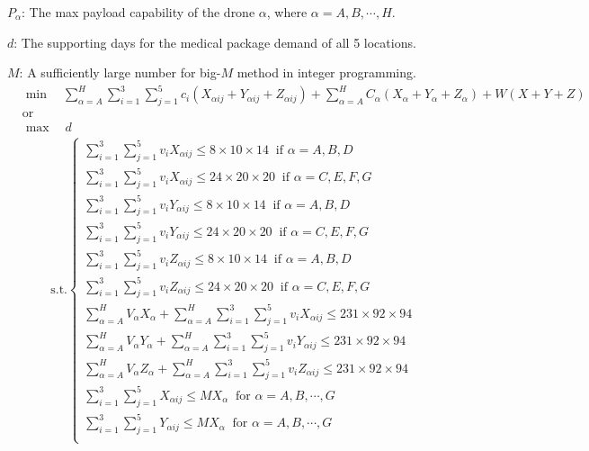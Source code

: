 \documentclass{mcmthesis}
\begin{document}
\noindent $P_\alpha$: The max payload capability of the drone $\alpha$, where $\alpha=A,B,\cdots,H$.

\noindent $d$: The supporting days for the medical package demand of all 5 locations.

\noindent $M$: A sufficiently large number for big-$M$ method in integer programming. 
\[
\begin{aligned}
&\min\quad\sum_{\alpha=A}^{H}\sum_{i=1}^{3}\sum_{j=1}^{5}c_{i}\left(X_{\alpha ij}+Y_{\alpha ij}+Z_{\alpha ij}\right)
+\sum_{\alpha=A}^{H}C_{{\alpha}}\left(X_{\alpha}+Y_{\alpha }+Z_{\alpha }\right)+W(X+Y+Z)\\
&\text{or}\\
&\max\quad d
\end{aligned}
\]
\[
\begin{aligned}
\text{s.t.}
\left\{
\begin{array}{lr}
\sum\limits_{i=1}^{3}\sum\limits_{j=1}^{5}v_{i}X_{\alpha ij}\le 8\times 10\times 14\ \text{ if }\alpha=A,B,D \\
\sum\limits_{i=1}^{3}\sum\limits_{j=1}^{5}v_{i}X_{\alpha ij}\le 24\times 20\times 20\ \text{ if }\alpha=C,E,F,G \\
\sum\limits_{i=1}^{3}\sum\limits_{j=1}^{5}v_{i}Y_{\alpha ij}\le 8\times 10\times 14\ \text{ if }\alpha=A,B,D \\
\sum\limits_{i=1}^{3}\sum\limits_{j=1}^{5}v_{i}Y_{\alpha ij}\le 24\times 20\times 20\ \text{ if }\alpha=C,E,F,G \\
\sum\limits_{i=1}^{3}\sum\limits_{j=1}^{5}v_{i}Z_{\alpha ij}\le 8\times 10\times 14\ \text{ if }\alpha=A,B,D \\
\sum\limits_{i=1}^{3}\sum\limits_{j=1}^{5}v_{i}Z_{\alpha ij}\le 24\times 20\times 20\ \text{ if }\alpha=C,E,F,G \\
\sum\limits_{\alpha=A}^{H}V_{\alpha}X_{\alpha}+\sum\limits_{\alpha=A}^{H}\sum\limits_{i=1}^{3}\sum\limits_{j=1}^{5}v_{i}X_{\alpha ij}\le 231\times92\times 94\\
\sum\limits_{\alpha=A}^{H}V_{\alpha}Y_{\alpha}+\sum\limits_{\alpha=A}^{H}\sum\limits_{i=1}^{3}\sum\limits_{j=1}^{5}v_{i}Y_{\alpha ij}\le 231\times92\times 94\\
\sum\limits_{\alpha=A}^{H}V_{\alpha}Z_{\alpha}+\sum\limits_{\alpha=A}^{H}\sum\limits_{i=1}^{3}\sum\limits_{j=1}^{5}v_{i}Z_{\alpha ij}\le 231\times92\times 94\\
\sum\limits_{i=1}^{3}\sum\limits_{j=1}^{5}X_{\alpha ij}\le M X_{\alpha}\ \text{ for }\alpha=A,B,\cdots, G\\
\sum\limits_{i=1}^{3}\sum\limits_{j=1}^{5}Y_{\alpha ij}\le M X_{\alpha}\ \text{ for }\alpha=A,B,\cdots, G\\

\end{array}
\end{aligned}\]
\end{document}
